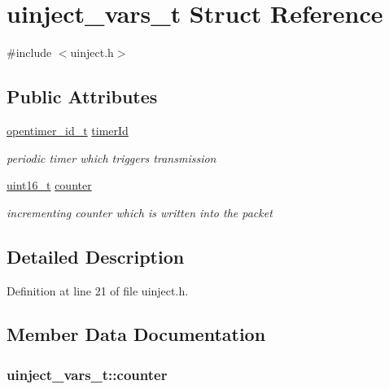 \hypertarget{structuinject__vars__t}{}\section{uinject\+\_\+vars\+\_\+t Struct Reference}
\label{structuinject__vars__t}


{\ttfamily \#include $<$uinject.\+h$>$}

\subsection*{Public Attributes}
\begin{DoxyCompactItemize}
\item 
\hyperlink{group___open_timers_gae5ca9e65d270cdfa4bc74008d96d69ab}{opentimer\+\_\+id\+\_\+t} \hyperlink{structuinject__vars__t_a18a921b840a55a17d55c43086741b74a}{timer\+Id}
\begin{DoxyCompactList}\small\item\em periodic timer which triggers transmission \end{DoxyCompactList}\item 
\hyperlink{_p_e___types_8h_a1f1825b69244eb3ad2c7165ddc99c956}{uint16\+\_\+t} \hyperlink{structuinject__vars__t_a97940d6759ea18706492ae05ad24730f}{counter}
\begin{DoxyCompactList}\small\item\em incrementing counter which is written into the packet \end{DoxyCompactList}\end{DoxyCompactItemize}


\subsection{Detailed Description}


Definition at line 21 of file uinject.\+h.



\subsection{Member Data Documentation}
\subsubsection[{\texorpdfstring{counter}{counter}}]{ uinject\+\_\+vars\+\_\+t\+::counter}\hypertarget{structuinject__vars__t_a97940d6759ea18706492ae05ad24730f}{}\label{structuinject__vars__t_a97940d6759ea18706492ae05ad24730f}


